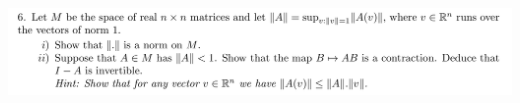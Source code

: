 \documentclass[12pt]{article}
\begin{document}
  %

\begin{mdframed}
  \includegraphics[width=400pt]{img/oxford-a2-2-6.png}
\end{mdframed}

\end{document}
